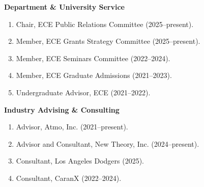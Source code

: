 \smallskip
\noindent\textbf{Department \& University Service}
\begin{enumerate}[leftmargin=*,itemsep=0.1em,topsep=0.15em,parsep=0pt,partopsep=0pt]
    \item Chair, ECE Public Relations Committee (2025--present).
    \item Member, ECE Grants Strategy Committee (2025--present).
    \item Member, ECE Seminars Committee (2022--2024).
    \item Member, ECE Graduate Admissions (2021--2023).
    \item Undergraduate Advisor, ECE (2021--2022).
\end{enumerate}

\smallskip
\noindent\textbf{Industry Advising \& Consulting}
\begin{enumerate}[leftmargin=*,itemsep=0.1em,topsep=0.15em,parsep=0pt,partopsep=0pt]
  \item Advisor, Atmo, Inc. (2021--present).
  \item Advisor and Consultant, New Theory, Inc. (2024--present).
  \item Consultant, Los Angeles Dodgers (2025).
  \item Consultant, CaranX (2022--2024).
\end{enumerate}
\endgroup